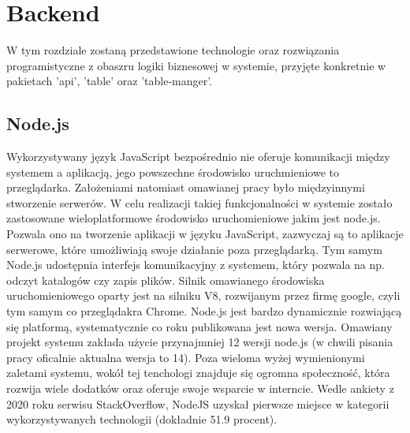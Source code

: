 \chapter{Backend}
\label{ch:backend}
W tym rozdziale zostaną przedstawione technologie oraz rozwiązania programistyczne z obaszru logiki biznesowej w systemie, przyjęte konkretnie w pakietach 'api', 'table' oraz 'table-manger'.

\label{section:node}
\section{Node.js}

Wykorzystywany język JavaScript bezpośrednio nie oferuje komunikacji między systemem a aplikacją, jego powszechne środowisko uruchmieniowe to przeglądarka. Założeniami natomiast omawianej pracy było międzyinnymi stworzenie serwerów. W celu realizacji takiej funkcjonalności w systemie zostało zastosowane wieloplatformowe środowisko uruchomieniowe jakim jest node.js. Pozwala ono na tworzenie aplikacji w języku JavaScript, zazwyczaj są to aplikacje serwerowe, które umożliwiają swoje działanie poza przeglądarką. Tym samym Node.js udostępnia interfejs komunikacyjny z systemem, który pozwala na np. odczyt katalogów czy  zapis plików. Silnik omawianego środowiska uruchomieniowego oparty jest na silniku V8, rozwijanym przez firmę google, czyli tym samym co przeglądakra Chrome. Node.js jest bardzo dynamicznie rozwiającą się platformą, systematycznie co roku publikowana jest nowa wersja. Omawiany projekt systemu zakłada użycie przynajmniej 12 wersji node.js (w chwili pisania pracy oficalnie aktualna wersja to 14). Poza wieloma wyżej wymienionymi zaletami systemu, wokół tej tenchologi znajduje się ogromna społeczność, która rozwija wiele dodatków oraz oferuje swoje wsparcie w interncie. Wedle ankiety z 2020 roku serwisu StackOverflow, NodeJS uzyskał pierwsze miejsce w kategorii wykorzystywanych technologii (dokładnie 51.9 procent). \cite{StackOverflowSurvey, ExpressDocs}

